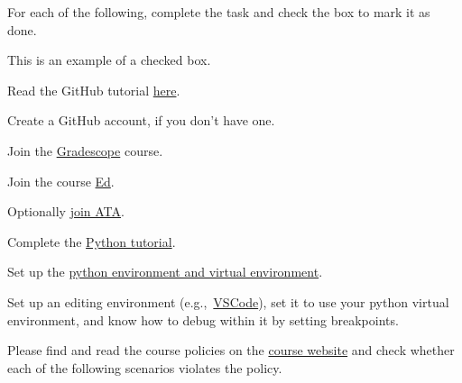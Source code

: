 \documentclass{csci1430}
\begin{document}
\pagebreak %

\begin{question}[points=4]
For each of the following, complete the task and check the box to mark it as done.
\end{question}

\begin{answerlist}
    \item[\done] This is an example of a checked box.
    \item Read the GitHub tutorial \href{https://browncsci1430.github.io/resources/github_guide/}{here}.
    \item Create a GitHub account, if you don't have one.
    \item Join the \href{https://www.gradescope.com/}{Gradescope} course.
    \item Join the course \href{https://edstem.org/}{Ed}.
    \item Optionally \href{https://talktoata.com/join/brown-university-csci1430-spring-2025}{join ATA}.
    \item Complete the \href{https://colab.research.google.com/drive/1K42Mk-CPl8Azql5SJRE9xfkiNwRyo9rs?usp=sharing}{Python tutorial}.
    \item Set up the \href{https://browncsci1430.github.io/resources/python_setup/}{python environment and virtual environment}.
    \item Set up an editing environment (e.g.,~\href{https://browncsci1430.github.io/resources/vscode_setup/}{VSCode}), set it to use your python virtual environment, and know how to debug within it by setting breakpoints.
\end{answerlist}

\pagebreak %

\begin{question}[points=4]
Please find and read the course policies on the \href{https://browncsci1430.github.io/}{course website} and check whether each of the following scenarios violates the policy.
\end{question}
\end{document}
